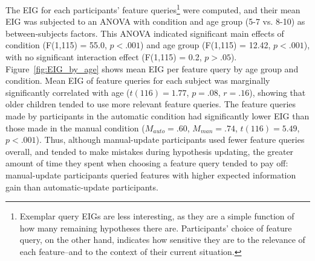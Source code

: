 \documentclass[10pt,letterpaper]{article}
\begin{document}
The EIG for each participants' feature queries\footnote{Exemplar query EIGs are 
less interesting, as they are a simple function of how many remaining hypotheses 
there are. Participants' choice of feature query, on the other hand, indicates how 
sensitive they are to the relevance of each feature--and to the context of their 
current situation.} were computed, and their mean EIG was 
subjected to an ANOVA with condition and age group (5-7 vs. 8-10) as between-subjects factors. 
This ANOVA indicated significant main effects of condition (F(1,115) = 55.0, $p<.001$) 
and age group (F(1,115) = 12.42, $p<.001$), with no significant interaction effect (F(1,115) = 0.2, $p>.05$).
Figure~\ref{fig:EIG_by_age} shows mean EIG per feature query by age group and condition. Mean 
EIG of feature queries for each subject was marginally significantly correlated with 
age ($t(116)=1.77$, $p=.08$, $r=.16$), showing that older children tended to use 
more relevant feature queries. The feature queries made by participants in the 
automatic condition had significantly lower EIG than those made in the manual 
condition ($M_{auto} = .60$, $M_{man} = .74$, $t(116) = 5.49$,  $p<.001$). Thus, 
although manual-update participants used fewer feature queries overall, and tended 
to make mistakes during hypothesis updating, the greater amount of time they spent 
when choosing a feature query tended to pay off: manual-update participants 
queried features with higher expected information gain than automatic-update 
participants. 


\end{document}
